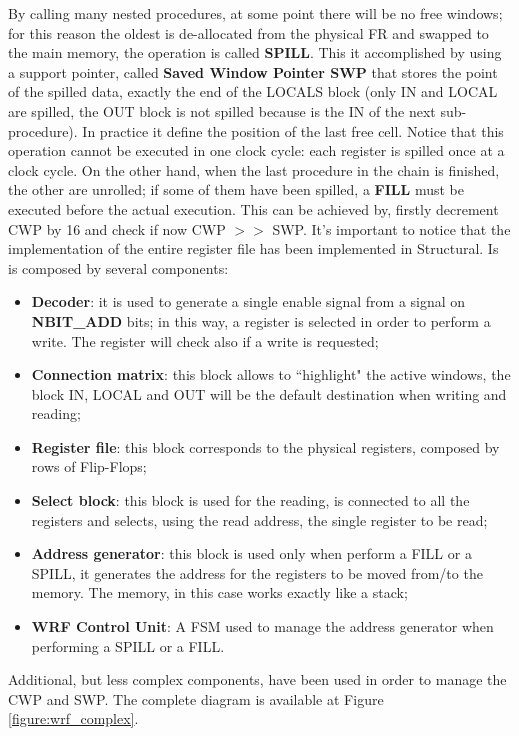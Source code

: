 By calling many nested procedures, at some point there will be no free windows; for this reason the oldest is de-allocated from the physical FR and swapped to the main memory, the operation is called \textbf{SPILL}. This it accomplished by using a support pointer, called \textbf{Saved Window Pointer SWP} that stores the point of the spilled data, exactly the end of the LOCALS block (only IN and LOCAL are spilled, the OUT block is not spilled because is the IN of the next sub-procedure). In practice it define the position of the last free cell. Notice that this operation cannot be executed in one clock cycle: each register is spilled once at a clock cycle.\newline\newline
On the other hand, when the last procedure in the chain is finished, the other are unrolled; if some of them have been spilled, a \textbf{FILL} must be executed before the actual execution. This can be achieved by, firstly decrement CWP by 16 and check if now CWP $>>$ SWP.\newline\newline
It's important to notice that the implementation of the entire register file has been implemented in Structural. Is is composed by several components:
\begin{itemize}
	\item \textbf{Decoder}: it is used to generate a single enable signal from a signal on \textbf{NBIT\_ADD} bits; in this way, a register is selected in order to perform a write. The register will check also if a write is requested;
	\item \textbf{Connection matrix}: this block allows to ``highlight" the active windows, the block IN, LOCAL and OUT will be the default destination when writing and reading;
	\item \textbf{Register file}: this block corresponds to the physical registers, composed by rows of Flip-Flops;
	\item \textbf{Select block}: this block is used for the reading, is connected to all the registers and selects, using the read address, the single register to be read;
	\item \textbf{Address generator}: this block is used only when perform a FILL or a SPILL, it generates the address for the registers to be moved from/to the memory. The memory, in this case works exactly like a stack;
	\item \textbf{WRF Control Unit}: A FSM used to manage the address generator when performing a SPILL or a FILL.
\end{itemize}
Additional, but less complex components, have been used in order to manage the CWP and SWP. The complete diagram is available at Figure \ref{figure:wrf_complex}.


